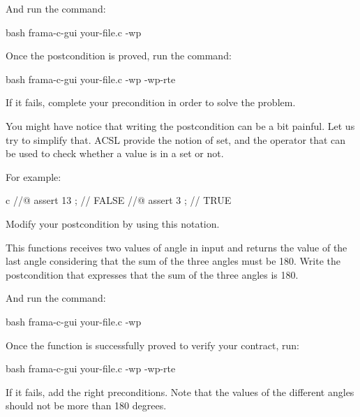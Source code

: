 And run the command:


\begin{CodeBlock}{bash}
frama-c-gui your-file.c -wp
\end{CodeBlock}


Once the postcondition is proved, run the command:



\begin{CodeBlock}{bash}
frama-c-gui your-file.c -wp -wp-rte
\end{CodeBlock}



If it fails, complete your precondition in order to solve the problem.



You might have notice that writing the postcondition can be a bit painful.
Let us try to simplify that. ACSL provide the notion of set, and the operator
 that can be used to check whether a value is
in a set or not.


For example:


\begin{CodeBlock}{c}
//@ assert 13  ; // FALSE
//@ assert 3   ; // TRUE
\end{CodeBlock}



Modify your postcondition by using this notation.






This functions receives two values of angle in input and returns the value
of the last angle considering that the sum of the three angles must be 180.
Write the postcondition that expresses that the sum of the three angles is
180.





And run the command:


\begin{CodeBlock}{bash}
frama-c-gui your-file.c -wp
\end{CodeBlock}


Once the function is successfully proved to verify your contract, run:


\begin{CodeBlock}{bash}
frama-c-gui your-file.c -wp -wp-rte
\end{CodeBlock}



If it fails, add the right preconditions. Note that the values of the different
angles should not be more than 180 degrees.

